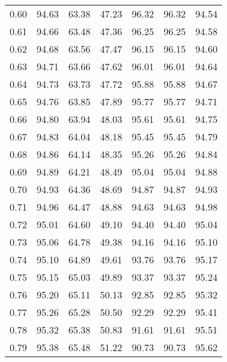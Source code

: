 \begin{tabular}{|c|c|c|c|c|c|c|}
      0.60 &     94.63 &     63.38 &      47.23 &   96.32 &      96.32 &         94.54 \\
      0.61 &     94.66 &     63.48 &      47.36 &   96.25 &      96.25 &         94.58 \\
      0.62 &     94.68 &     63.56 &      47.47 &   96.15 &      96.15 &         94.60 \\
      0.63 &     94.71 &     63.66 &      47.62 &   96.01 &      96.01 &         94.64 \\
      0.64 &     94.73 &     63.73 &      47.72 &   95.88 &      95.88 &         94.67 \\
      0.65 &     94.76 &     63.85 &      47.89 &   95.77 &      95.77 &         94.71 \\
      0.66 &     94.80 &     63.94 &      48.03 &   95.61 &      95.61 &         94.75 \\
      0.67 &     94.83 &     64.04 &      48.18 &   95.45 &      95.45 &         94.79 \\
      0.68 &     94.86 &     64.14 &      48.35 &   95.26 &      95.26 &         94.84 \\
      0.69 &     94.89 &     64.21 &      48.49 &   95.04 &      95.04 &         94.88 \\
      0.70 &     94.93 &     64.36 &      48.69 &   94.87 &      94.87 &         94.93 \\
      0.71 &     94.96 &     64.47 &      48.88 &   94.63 &      94.63 &         94.98 \\
      0.72 &     95.01 &     64.60 &      49.10 &   94.40 &      94.40 &         95.04 \\
      0.73 &     95.06 &     64.78 &      49.38 &   94.16 &      94.16 &         95.10 \\
      0.74 &     95.10 &     64.89 &      49.61 &   93.76 &      93.76 &         95.17 \\
      0.75 &     95.15 &     65.03 &      49.89 &   93.37 &      93.37 &         95.24 \\
      0.76 &     95.20 &     65.11 &      50.13 &   92.85 &      92.85 &         95.32 \\
      0.77 &     95.26 &     65.28 &      50.50 &   92.29 &      92.29 &         95.41 \\
      0.78 &     95.32 &     65.38 &      50.83 &   91.61 &      91.61 &         95.51 \\
      0.79 &     95.38 &     65.48 &      51.22 &   90.73 &      90.73 &         95.62 \\

\end{tabular}
